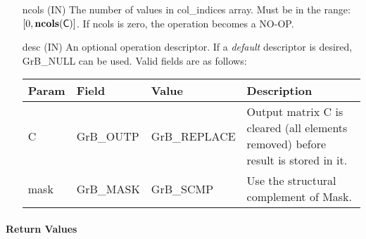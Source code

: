 \begin{itemize}[leftmargin=1.1in]
    \item[{\sf ncols}] ({\sf IN}) The number of values in {\sf col\_indices} 
	array. Must be in the range: $[0, \bold{ncols}({\sf C})]$.  If
    {\sf ncols} is zero, the operation becomes a NO-OP.

    \item[{\sf desc}]     ({\sf IN}) An optional operation descriptor.  If a 
    \emph{default} descriptor is desired, {\sf GrB\_NULL} can be used.  Valid 
    fields are as follows: \\
    
    \begin{tabular}{lllp{2.5in}}
    Param & Field  & Value & Description \\
    \hline
        {\sf C}    & {\sf GrB\_OUTP} & {\sf GrB\_REPLACE} & Output matrix {\sf C} 
        is cleared (all elements removed) before result is stored in it.\\
    
        {\sf mask} & {\sf GrB\_MASK} & {\sf GrB\_SCMP} & Use the structural 
        complement of {\sf Mask}. \\
    \end{tabular}

\end{itemize}

\paragraph{Return Values}


